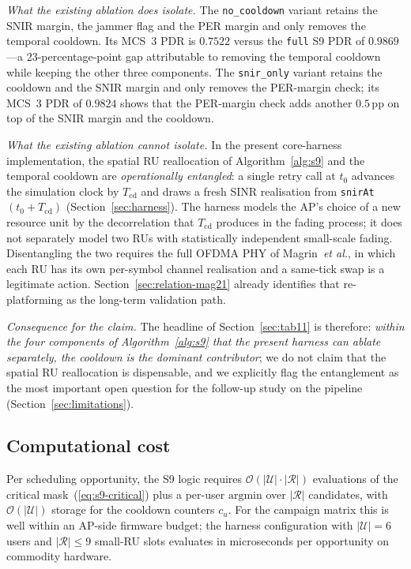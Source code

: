 \documentclass[journal,onecolumn,11pt,a4paper]{IEEEtran}
\begin{document}
\emph{What the existing ablation does isolate.} The
\texttt{no\_cooldown} variant retains the SNIR margin, the jammer
flag and the PER margin and only removes the temporal cooldown.
Its MCS~3 PDR is $0.7522$ versus the \texttt{full} S9 PDR of
$0.9869$---a 23-percentage-point gap attributable to removing
the temporal cooldown while keeping the other three components.
The \texttt{snir\_only} variant retains the cooldown and the SNIR
margin and only removes the PER-margin check; its MCS~3 PDR of
$0.9824$ shows that the PER-margin check adds another $0.5$\,pp
on top of the SNIR margin and the cooldown.

\emph{What the existing ablation cannot isolate.} In the present
core-harness implementation, the spatial RU reallocation of
Algorithm~\ref{alg:s9} and the temporal cooldown are
\emph{operationally entangled}: a single retry call at $t_0$
advances the simulation clock by $T_{\mathrm{cd}}$ and draws a fresh
SINR realisation from \texttt{snirAt}$(t_0 + T_{\mathrm{cd}})$
(Section~\ref{sec:harness}). The harness models the AP's choice
of a new resource unit by the decorrelation that
$T_{\mathrm{cd}}$ produces in the fading process; it does not
separately model two RUs with statistically independent
small-scale fading. Disentangling the two requires the full
OFDMA PHY of Magrin~\emph{et al.}\xspace \cite{Mag21}, in which each RU has
its own per-symbol channel realisation and a same-tick swap is a
legitimate action. Section~\ref{sec:relation-mag21} already
identifies that re-platforming as the long-term validation path.

\emph{Consequence for the claim.} The headline of
Section~\ref{sec:tab11} is therefore: \emph{within the four
components of Algorithm~\ref{alg:s9} that the present harness can
ablate separately, the cooldown is the dominant contributor}; we
do not claim that the spatial RU reallocation is dispensable, and
we explicitly flag the entanglement as the most important open
question for the follow-up study on the
\cite{Mag21} pipeline (Section~\ref{sec:limitations}).

\subsection{Computational cost}
\label{sec:complexity}

Per scheduling opportunity, the S9 logic requires
$\mathcal{O}(|\mathcal{U}|\cdot |\mathcal{R}|)$ evaluations of the
critical mask~(\ref{eq:s9-critical}) plus a per-user
$\mathrm{argmin}$ over $|\mathcal{R}|$ candidates, with
$\mathcal{O}(|\mathcal{U}|)$ storage for the cooldown counters
$c_u$. For the campaign matrix this is well within an AP-side
firmware budget; the harness configuration with $|\mathcal{U}|=6$
users and $|\mathcal{R}|\le 9$ small-RU slots evaluates in microseconds
per opportunity on commodity hardware.
\end{document}
